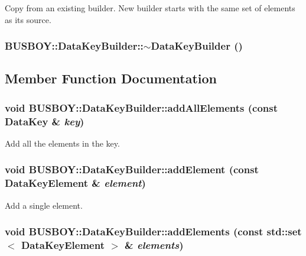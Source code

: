 Copy from an existing builder. New builder starts with the same set of elements as its source. \hypertarget{classBUSBOY_1_1DataKeyBuilder_aac6b7ac4f8e5d2ac37440d0dddbbdc6a}{
\subsubsection[{$\sim$DataKeyBuilder}]{\setlength{\rightskip}{0pt plus 5cm}BUSBOY::DataKeyBuilder::$\sim$DataKeyBuilder ()}}
\label{classBUSBOY_1_1DataKeyBuilder_aac6b7ac4f8e5d2ac37440d0dddbbdc6a}


\subsection{Member Function Documentation}
\hypertarget{classBUSBOY_1_1DataKeyBuilder_a853b4ba99c8f62865601e7bd25f94597}{
\subsubsection[{addAllElements}]{\setlength{\rightskip}{0pt plus 5cm}void BUSBOY::DataKeyBuilder::addAllElements (const {\bf DataKey} \& {\em key})}}
\label{classBUSBOY_1_1DataKeyBuilder_a853b4ba99c8f62865601e7bd25f94597}


Add all the elements in the key. \hypertarget{classBUSBOY_1_1DataKeyBuilder_a7f3b8d21410ed748f817972282905c68}{
\subsubsection[{addElement}]{\setlength{\rightskip}{0pt plus 5cm}void BUSBOY::DataKeyBuilder::addElement (const {\bf DataKeyElement} \& {\em element})}}
\label{classBUSBOY_1_1DataKeyBuilder_a7f3b8d21410ed748f817972282905c68}


Add a single element. \hypertarget{classBUSBOY_1_1DataKeyBuilder_aaaa7e47e047fd2620e76879aa594c639}{
\subsubsection[{addElements}]{\setlength{\rightskip}{0pt plus 5cm}void BUSBOY::DataKeyBuilder::addElements (const std::set$<$ {\bf DataKeyElement} $>$ \& {\em elements})}}
\label{classBUSBOY_1_1DataKeyBuilder_aaaa7e47e047fd2620e76879aa594c639}



